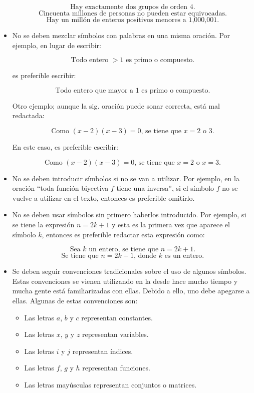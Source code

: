 \begin{itemize}
    \[
        \text{Hay exactamente dos grupos de orden 4.}
    \]
    \[
        \text{Cincuenta millones de personas no pueden estar equivocadas.}
    \]
    \[
        \text{Hay un millón de enteros positivos menores a 1,000,001.}
    \]
    
    \item No se deben mezclar símbolos con palabras en una misma oración. Por
    ejemplo, en lugar de escribir:
    
    \[
        \text{Todo entero }>1\text{ es primo o compuesto.}
    \]
    
    es preferible escribir:
    
    \[
        \text{Todo entero que mayor a 1 es primo o compuesto.}
    \]

    Otro ejemplo; aunque la sig. oración puede sonar correcta, está mal
    redactada:
    
    \[
        \text{Como }(x-2)(x-3)=0\text{, se tiene que }x=2\text{ o }3.
    \]
    
    En este caso, es preferible escribir:
    
    \[
        \text{Como }(x-2)(x-3)=0\text{, se tiene que }x=2\text{ o }x=3.
    \]

    \item No se deben introducir símbolos si no se van a utilizar. Por ejemplo,
    en la oración ``toda función biyectiva $f$ tiene una inversa'',
    si el símbolo $f$ no se vuelve a utilizar en el texto, entonces
    es preferible omitirlo. 

    \item No se deben usar símbolos sin primero haberlos introducido. Por ejemplo,
    si se tiene la expresión $n=2k+1$ y esta es la primera vez que aparece
    el símbolo $k$, entonces es preferible redactar esta expresión como:
    
    \[
        \text{Sea }k\text{ un entero, se tiene que }n=2k+1.
    \]
    \[
        \text{Se tiene que }n=2k+1\text{, donde }k\text{ es un entero.}
    \]
    
    \item Se deben seguir convenciones tradicionales sobre el uso de
    algunos símbolos. Estas convenciones se vienen utilizando en la
    desde hace mucho tiempo y mucha gente está familiarizadas con ellas. 
    Debido a ello, uno debe apegarse a ellas. Algunas de estas convenciones son:

    \begin{itemize}
        \item Las letras $a$, $b$ y $c$ representan constantes. 
        \item Las letras $x$, $y$ y $z$ representan variables. 
        \item Las letras $i$ y $j$ representan índices.
        \item Las letras $f$, $g$ y $h$ representan funciones. 
        \item Las letras mayúsculas representan conjuntos o matrices.
    \end{itemize}
    

\end{itemize}
